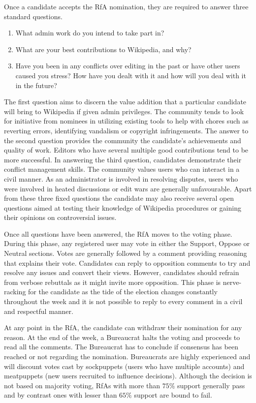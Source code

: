 Once a candidate accepts the RfA nomination, they are required to answer three standard questions. 
\begin{enumerate}
    \item What admin work do you intend to take part in?
    \item What are your best contributions to Wikipedia, and why?
    \item Have you been in any conflicts over editing in the past or have other users caused you stress? How have you dealt with it and how will you deal with it in the future?
\end{enumerate}
The first question aims to discern the value addition that a particular candidate will bring to Wikipedia if given admin privileges.
The community tends to look for initiative from nominees in utilizing existing tools to help with chores such as reverting errors, identifying vandalism or copyright infringements.
The answer to the second question provides the community the candidate's achievements and quality of work.
Editors who have several multiple good contributions tend to be more successful.
In answering the third question, candidates demonstrate their conflict management skills.
The community values users who can interact in a civil manner.
As an administrator is involved in resolving disputes, users who were involved in heated discussions or edit wars are generally unfavourable.
Apart from these three fixed questions the candidate may also receive several open questions aimed at testing their knowledge of Wikipedia procedures or gaining their opinions on controversial issues.

Once all questions have been answered, the RfA moves to the voting phase.
During this phase, any registered user may vote in either the Support, Oppose or Neutral sections.
Votes are generally followed by a comment providing reasoning that explains their vote.
Candidates can reply to opposition comments to try and resolve any issues and convert their views.
However, candidates should refrain from verbose rebuttals as it might invite more opposition.
This phase is nerve-racking for the candidate as the tide of the election changes constantly throughout the week and it is not possible to reply to every comment in a civil and respectful manner.

At any point in the RfA, the candidate can withdraw their nomination for any reason.
At the end of the week, a Bureaucrat halts the voting and proceeds to read all the comments.
The Bureaucrat has to conclude if consensus has been reached or not regarding the nomination.
Bureaucrats are highly experienced and will discount votes cast by sockpuppets (users who have multiple accounts) and meatpuppets (new users recruited to influence decisions).
Although the decision is not based on majority voting, RfAs with more than $75\%$ support generally pass and by contrast ones with lesser than $65\%$ support are bound to fail.  


